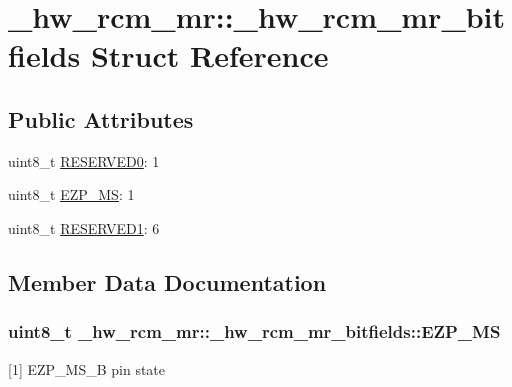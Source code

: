 \hypertarget{struct__hw__rcm__mr_1_1__hw__rcm__mr__bitfields}{}\section{\+\_\+hw\+\_\+rcm\+\_\+mr\+:\+:\+\_\+hw\+\_\+rcm\+\_\+mr\+\_\+bitfields Struct Reference}
\label{struct__hw__rcm__mr_1_1__hw__rcm__mr__bitfields}
\subsection*{Public Attributes}
\begin{DoxyCompactItemize}
\item 
uint8\+\_\+t \hyperlink{struct__hw__rcm__mr_1_1__hw__rcm__mr__bitfields_aa3d2da1748bb177743ff74075c168993}{R\+E\+S\+E\+R\+V\+E\+D0}\+: 1
\item 
uint8\+\_\+t \hyperlink{struct__hw__rcm__mr_1_1__hw__rcm__mr__bitfields_ad2b51b0b2df303dcf96d130feafbfc8a}{E\+Z\+P\+\_\+\+MS}\+: 1
\item 
uint8\+\_\+t \hyperlink{struct__hw__rcm__mr_1_1__hw__rcm__mr__bitfields_abf6ff1045628abeb614960c4f521b078}{R\+E\+S\+E\+R\+V\+E\+D1}\+: 6
\end{DoxyCompactItemize}


\subsection{Member Data Documentation}
\subsubsection[{\texorpdfstring{E\+Z\+P\+\_\+\+MS}{EZP_MS}}]{\setlength{\rightskip}{0pt plus 5cm}uint8\+\_\+t \+\_\+hw\+\_\+rcm\+\_\+mr\+::\+\_\+hw\+\_\+rcm\+\_\+mr\+\_\+bitfields\+::\+E\+Z\+P\+\_\+\+MS}\hypertarget{struct__hw__rcm__mr_1_1__hw__rcm__mr__bitfields_ad2b51b0b2df303dcf96d130feafbfc8a}{}\label{struct__hw__rcm__mr_1_1__hw__rcm__mr__bitfields_ad2b51b0b2df303dcf96d130feafbfc8a}
\mbox{[}1\mbox{]} E\+Z\+P\+\_\+\+M\+S\+\_\+B pin state 
